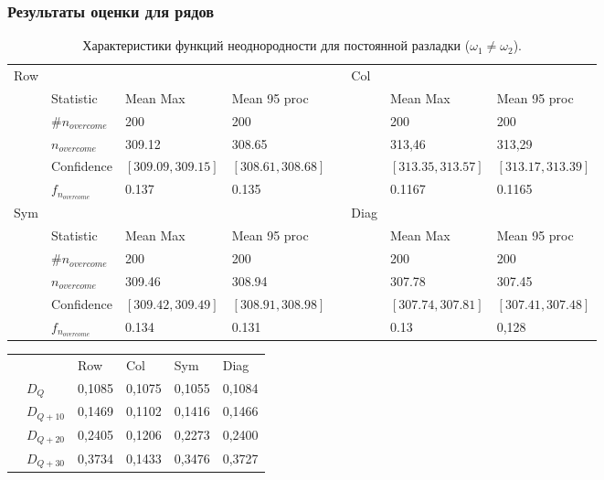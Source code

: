 \documentclass[11pt]{beamer}
\begin{document}
	\begin{frame}
		\frametitle{Результаты оценки для рядов}
		\tiny
		\begin{table}[!hhh]
			\caption{Характеристики функций неоднородности для постоянной разладки ($\omega_1 \neq \omega_2$).}
			\begin{tabular}{llllllll}
				Row & 				   & 		  	  & 			 && Col & 		      & 			      \\
				    & Statistic        & Mean Max 	  & Mean 95 proc && 	& Mean Max     & Mean 95 proc     \\
				    & $\#n_{overcome}$ & 200 	  	  & 200 		 &&     & 200 	      & 200 			  \\
				    & $n_{overcome}$   & 309.12   	  & 308.65      &&     & 313,46       & 313,29 		  \\
				    & Confidence       & $[309.09, 309.15]$& $[308.61, 308.68]$&&     & $[313.35, 313.57]$ & $[313.17, 313.39]$     \\
				    &$f_{n_{overcome}}$& 0.137		  &	0.135		 &&     & 0.1167			  &   0.1165                \\
				Sym & 				   & 		  	  & 			 && Diag& 		      & 			      \\
					& Statistic        & Mean Max 	  & Mean 95 proc && 	& Mean Max     & Mean 95 proc     \\
					& $\#n_{overcome}$ & 200 	  	  & 200 		 &&     & 200 	      & 200 			  \\
					& $n_{overcome}$   & 309.46   	  & 308.94      &&     & 307.78      & 307.45 		  \\
					& Confidence       & $[309.42, 309.49]$ & $[308.91, 308.98]$ &&     & $[307.74, 307.81]$ & $[307.41, 307.48]$     \\
					&$f_{n_{overcome}}$& 0.134		  &	0.131		 &&     & 0.13		 &0,128                   \\
			\end{tabular}
		\end{table}
		\begin{table}[!hhh]
			\begin{tabular}{llllll}
				&              & Row 	  & Col 	& Sym    & Diag  \\
				& $D_Q$        & 0,1085	  & 0,1075 	& 0,1055 & 0,1084		\\
				& $D_{Q+10}$   & 0,1469   & 0,1102  & 0,1416 & 0,1466	\\
				& $D_{Q+20}$   & 0,2405   & 0,1206  & 0,2273 & 0,2400	\\
				& $D_{Q+30}$   & 0,3734	  &	0,1433	& 0,3476 & 0,3727	
			\end{tabular}
		\end{table}
	\end{frame}
\end{document}
